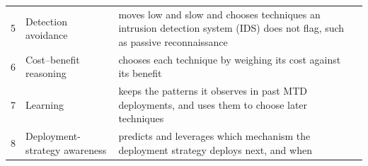 \documentclass{cshonours}
\begin{document}
\begin{table}[tbp]
\begin{tabular}{@{}rP{4.0cm}P{8.2cm}P{2.2cm}@{}}
    5 & Detection avoidance & moves low and slow and chooses techniques an intrusion detection system (IDS) does not flag, such as passive reconnaissance & \citep{alshamrani2019, jalowski2026} \\
    6 & Cost--benefit reasoning & chooses each technique by weighing its cost against its benefit & \citep{cho2020} \\
    7 & Learning & keeps the patterns it observes in past MTD deployments, and uses them to choose later techniques & \citep{cho2020, jalowski2026} \\
    8 & Deployment-strategy awareness & predicts and leverages which mechanism the deployment strategy deploys next, and when & \citep{cho2020, jalowski2026} \\
    \bottomrule
  \end{tabular}
\end{table}
\end{document}
